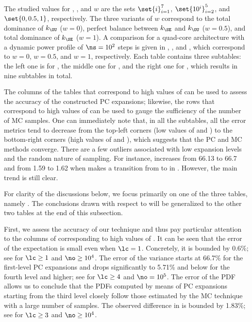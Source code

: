 The studied values for \lc, \no, and $w$ are the sets $\set{i}_{i = 1}^7$,
$\set{10^i}_{i = 2}^5$, and $\set{0, 0.5, 1}$, respectively. The three variants
of $w$ correspond to the total dominance of $k_\OU$ ($w = 0$), perfect balance
between $k_\SE$ and $k_\OU$ ($w = 0.5$), and total dominance of $k_\SE$ ($w =
1$). A comparison for a quad-core architecture with a dynamic power profile of
$\ns = 10^2$ steps is given in ,
, and ,
which correspond to $w = 0$, $w = 0.5$, and $w = 1$, respectively. Each table
contains three subtables: the left one is for \error{\expectation}, the middle
one for \error{\variance}, and the right one for , which results in
nine subtables in total.

The columns of the tables that correspond to high values of \no can be used to
assess the accuracy of the constructed \ac{PC} expansions; likewise, the rows
that correspond to high values of \lc can be used to gauge the sufficiency of
the number of \ac{MC} samples. One can immediately note that, in all the
subtables, all the error metrics tend to decrease from the top-left corners (low
values of \lc and \no) to the bottom-right corners (high values of \lc and \no),
which suggests that the \ac{PC} and \ac{MC} methods converge. There are a few
outliers associated with low expansion levels and the random nature of sampling.
For instance, \error{\variance} increases from 66.13 to 66.7 and  from
1.59 to 1.62 when \no makes a transition from  to  in
. However, the main trend is still clear.

For clarity of the discussions below, we focus primarily on one of the three
tables, namely . The conclusions drawn with
respect to  will be generalized to the other
two tables at the end of this subsection.

First, we assess the accuracy of our technique and thus pay particular attention
to the columns of  corresponding to high
values of \no. It can be seen that the error of the expectation is small even
when $\lc = 1$. Concretely, it is bounded by 0.6\%; see \error{\expectation} for
$\lc \geq 1$ and $\no \geq 10^4$. The error of the variance starts at 66.7\% for
the first-level \ac{PC} expansions and drops significantly to 5.71\% and below
for the fourth level and higher; see \error{\variance} for $\lc \geq 4$ and $\no
= 10^5$. The error of the \ac{PDF} allows us to conclude that the \acp{PDF}
computed by means of \ac{PC} expansions starting from the third level closely
follow those estimated by the \ac{MC} technique with a large number of samples.
The observed difference in  is bounded by
1.83\%; see  for $\lc \geq 3$ and $\no \geq 10^4$.

